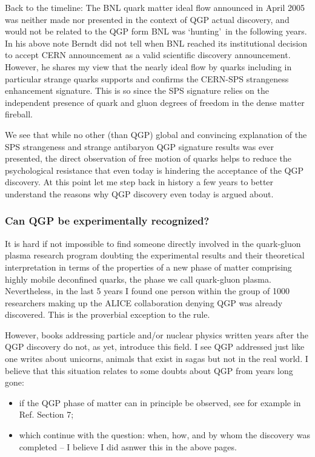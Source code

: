 Back to the timeline: The BNL quark matter ideal flow announced in April 2005 was neither made nor presented in the context of QGP actual discovery, and would not be related to the QGP form BNL was \lq hunting\rq\ in the following years. In his above note Berndt did not tell when BNL reached its institutional decision to accept CERN announcement as a valid scientific discovery announcement. However, he shares my view that the nearly ideal flow by quarks including in particular strange quarks supports and confirms the CERN-SPS strangeness enhancement signature. This is so since the SPS signature relies on the independent presence of quark and gluon degrees of freedom in the dense matter fireball. 
 
We see that while no other (than QGP) global and convincing explanation of the SPS strangeness and strange antibaryon QGP signature results was ever presented, the direct observation of free motion of quarks helps to reduce the psychological resistance that even today is hindering the acceptance of the QGP discovery. At this point let me step back in history a few years to better understand the reasons why QGP discovery even today is argued about. 

\subsubsection{Can QGP be experimentally recognized?}
\label{canQGP}
\label{subsubsec:hoho}
It is hard if not impossible to find someone directly involved in the quark-gluon plasma research program doubting the experimental results and their theoretical interpretation in terms of the properties of a new phase of matter comprising highly mobile deconfined quarks, the phase we call quark-gluon plasma. Nevertheless, in the last 5 years I found one person within the group of 1000 researchers making up the ALICE collaboration denying QGP was already discovered. This is the proverbial exception to the rule. 

However, books addressing particle and/or nuclear physics written years after the QGP discovery do not, as yet, introduce this field. I see QGP addressed just like one writes about unicorns, animals that exist in sagas but not in the real world. I believe that this situation relates to some doubts about QGP from years long gone:
\begin{itemize}
\item if the QGP phase of matter can in principle be observed, see for example in Ref.\cite{Muller:1991jk} Section 7;
\item which continue with the question: when, how, and by whom the discovery was completed -- I believe I did asnwer this in the above pages.
\end{itemize}

